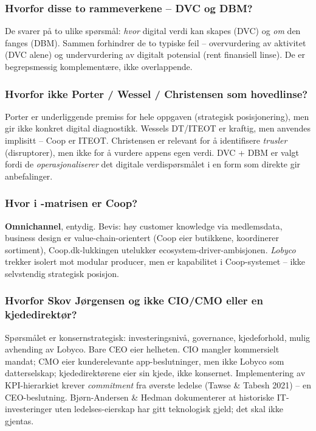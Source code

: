 \subsubsection*{\guillemotleft{}Hvorfor disse to rammeverkene -- DVC og DBM?\guillemotright{}}
De svarer på to ulike spørsmål: \emph{hvor} digital verdi kan skapes (DVC) og
\emph{om} den fanges (DBM). Sammen forhindrer de to typiske feil --
overvurdering av aktivitet (DVC alene) og undervurdering av digitalt
potensial (rent finansiell linse). De er begrepsmessig komplementære, ikke
overlappende.

\subsubsection*{\guillemotleft{}Hvorfor ikke Porter / Wessel / Christensen som hovedlinse?\guillemotright{}}
Porter er underliggende premiss for hele oppgaven (strategisk
posisjonering), men gir ikke konkret digital diagnostikk. Wessels DT/ITEOT
er kraftig, men anvendes implisitt -- Coop er ITEOT. Christensen er relevant
for å identifisere \emph{trusler} (disruptorer), men ikke for å vurdere
appens egen verdi. DVC + DBM er valgt fordi de \emph{operasjonaliserer} det
digitale verdispørsmålet i en form som direkte gir anbefalinger.

\subsubsection*{\guillemotleft{}Hvor i -matrisen er Coop?\guillemotright{}}
\textbf{Omnichannel}, entydig. Bevis: høy customer knowledge via medlemsdata,
business design er value-chain-orientert (Coop eier butikkene, koordinerer
sortiment), Coop.dk-lukkingen utelukker ecosystem-driver-ambisjonen.
\emph{Lobyco} trekker isolert mot modular producer, men er kapabilitet i
Coop-systemet -- ikke selvstendig strategisk posisjon.

\subsubsection*{\guillemotleft{}Hvorfor Skov Jørgensen og ikke CIO/CMO eller en kjededirektør?\guillemotright{}}
Spørsmålet er konsernstrategisk: investeringsnivå, governance, kjedeforhold,
mulig avhending av Lobyco. Bare CEO eier helheten. CIO mangler kommersielt
mandat; CMO eier kunderelevante app-beslutninger, men ikke Lobyco som
datterselskap; kjededirektørene eier sin kjede, ikke konsernet. Implementering
av KPI-hierarkiet krever \emph{commitment} fra øverste ledelse (Tawse \&
Tabesh 2021) -- en CEO-beslutning. Bjørn-Andersen \& Hedman dokumenterer at
historiske IT-investeringer uten ledelses-eierskap har gitt teknologisk
gjeld; det skal ikke gjentas.


